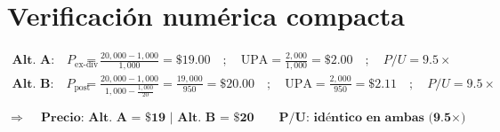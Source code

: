 \documentclass[12pt,a4paper]{article}
\begin{document}
\section*{Verificaci\'on num\'erica compacta}

\begin{align*}
\textbf{Alt.\ A:}\quad
P_{\text{ex-div}} &= \frac{20{,}000 - 1{,}000}{1{,}000} = \$19.00
\quad;\quad
\text{UPA} = \frac{2{,}000}{1{,}000} = \$2.00
\quad;\quad
P/U = 9.5\times \\[8pt]
\textbf{Alt.\ B:}\quad
P_{\text{post}} &= \frac{20{,}000 - 1{,}000}{1{,}000 - \frac{1{,}000}{20}}
= \frac{19{,}000}{950} = \$20.00
\quad;\quad
\text{UPA} = \frac{2{,}000}{950} = \$2.11
\quad;\quad
P/U = 9.5\times
\end{align*}

\[
\Rightarrow\quad
\boxed{
\textbf{Precio: Alt.\ A = \$19 \ | \ Alt.\ B = \$20}
\qquad
\textbf{P/U: id\'entico en ambas (9.5}\times\textbf{)}
}
\]
\end{document}

